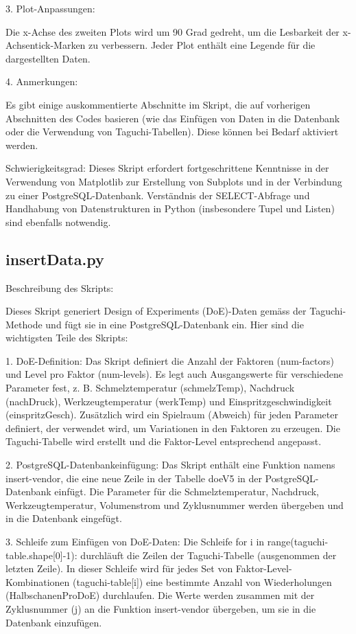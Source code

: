 3. Plot-Anpassungen:

    Die x-Achse des zweiten Plots wird um 90 Grad gedreht, um die Lesbarkeit der x-Achsentick-Marken zu verbessern.
    Jeder Plot enthält eine Legende für die dargestellten Daten.

4. Anmerkungen:

    Es gibt einige auskommentierte Abschnitte im Skript, die auf vorherigen Abschnitten des Codes basieren (wie das Einfügen von Daten in die Datenbank oder die Verwendung von Taguchi-Tabellen). Diese können bei Bedarf aktiviert werden.

Schwierigkeitsgrad:
Dieses Skript erfordert fortgeschrittene Kenntnisse in der Verwendung von Matplotlib zur Erstellung von Subplots und in der Verbindung zu einer PostgreSQL-Datenbank. Verständnis der SELECT-Abfrage und Handhabung von Datenstrukturen in Python (insbesondere Tupel und Listen) sind ebenfalls notwendig.

\subsection{insertData.py}
Beschreibung des Skripts:

Dieses Skript generiert Design of Experiments (DoE)-Daten gemäss der Taguchi-Methode und fügt sie in eine PostgreSQL-Datenbank ein. Hier sind die wichtigsten Teile des Skripts:

1. DoE-Definition:
Das Skript definiert die Anzahl der Faktoren (num-factors) und Level pro Faktor (num-levels). Es legt auch Ausgangswerte für verschiedene Parameter fest, z. B. Schmelztemperatur (schmelzTemp), Nachdruck (nachDruck), Werkzeugtemperatur (werkTemp) und Einspritzgeschwindigkeit (einspritzGesch). Zusätzlich wird ein Spielraum (Abweich) für jeden Parameter definiert, der verwendet wird, um Variationen in den Faktoren zu erzeugen. Die Taguchi-Tabelle wird erstellt und die Faktor-Level entsprechend angepasst.

2. PostgreSQL-Datenbankeinfügung:
Das Skript enthält eine Funktion namens insert-vendor, die eine neue Zeile in der Tabelle doeV5 in der PostgreSQL-Datenbank einfügt. Die Parameter für die Schmelztemperatur, Nachdruck, Werkzeugtemperatur, Volumenstrom und Zyklusnummer werden übergeben und in die Datenbank eingefügt.

3. Schleife zum Einfügen von DoE-Daten:
Die Schleife for i in range(taguchi-table.shape[0]-1): durchläuft die Zeilen der Taguchi-Tabelle (ausgenommen der letzten Zeile). In dieser Schleife wird für jedes Set von Faktor-Level-Kombinationen (taguchi-table[i]) eine bestimmte Anzahl von Wiederholungen (HalbschanenProDoE) durchlaufen. Die Werte werden zusammen mit der Zyklusnummer (j) an die Funktion insert-vendor übergeben, um sie in die Datenbank einzufügen.

